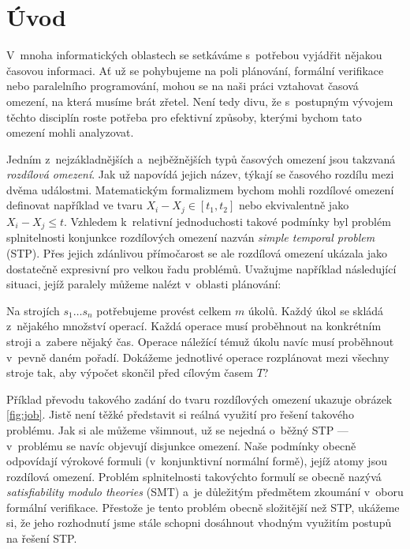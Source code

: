 \chapter*{Úvod}

V~mnoha informatických oblastech se setkáváme s~potřebou vyjádřit nějakou časovou informaci. Ať už se pohybujeme na poli plánování, formální verifikace nebo paralelního programování, mohou se na naši práci vztahovat časová omezení, na která musíme brát zřetel. Není tedy divu, že s~postupným vývojem těchto disciplín roste potřeba pro efektivní způsoby, kterými bychom tato omezení mohli analyzovat.

Jedním z~nejzákladnějších a~nejběžnějších typů časových omezení jsou takzvaná \emph{rozdílová omezení}. Jak už napovídá jejich název, týkají se časového rozdílu mezi dvěma událostmi. Matematickým formalizmem bychom mohli rozdílové omezení definovat například ve tvaru $X_i - X_j \in [t_1, t_2]$ nebo ekvivalentně jako $X_i - X_j \leq t$. Vzhledem k~relativní jednoduchosti takové podmínky byl problém splnitelnosti konjunkce rozdílových omezení nazván \emph{simple temporal problem} (STP). Přes jejich zdánlivou přímočarost se ale rozdílová omezení ukázala jako dostatečně expresivní pro velkou řadu problémů. Uvažujme například následující situaci, jejíž paralely můžeme nalézt v~oblasti plánování: 

\begin{center}
\begin{minipage}{\textwidth}
Na strojích $s_1 \dots s_n$ potřebujeme provést celkem $m$ úkolů. Každý úkol se skládá z~nějakého množství operací. Každá operace musí proběhnout na konkrétním stroji a~zabere nějaký čas. Operace náležící témuž úkolu navíc musí proběhnout v~pevně daném pořadí. Dokážeme jednotlivé operace rozplánovat mezi všechny stroje tak, aby výpočet skončil před cílovým časem $T$?
\end{minipage}
\end{center}

Příklad převodu takového zadání do tvaru rozdílových omezení ukazuje obrázek \ref{fig:job}. Jistě není těžké představit si reálná využití pro řešení takového problému. Jak si ale můžeme všimnout, už se nejedná o~běžný STP --- v~problému se navíc objevují disjunkce omezení. Naše podmínky obecně odpovídají výrokové formuli (v~konjunktivní normální formě), jejíž atomy jsou rozdílová omezení. Problém splnitelnosti takovýchto formulí se obecně nazývá \emph{satisfiability modulo theories} (SMT) a~je důležitým předmětem zkoumání v~oboru formální verifikace. Přestože je tento problém obecně složitější než STP, ukážeme si, že jeho rozhodnutí jsme stále schopni dosáhnout vhodným využitím postupů na řešení STP.

